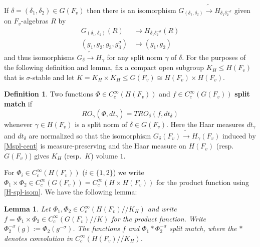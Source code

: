 \documentclass[12pt]{amsart}
\newtheorem{lem}[thm]{Lemma}
\theoremstyle{remark}
\numberwithin{equation}{section}
\newcommand{\lto}{\longrightarrow}
\theoremstyle{definition}
\newtheorem{defn}[thm]{Definition}
\numberwithin{equation}{subsection}
\begin{document}
If $\delta =(\delta_1,\delta_2) \in G(F_v)$ then there is an isomorphism $G_{(\delta_1,\delta_2)} \tilde{\to}H_{\delta_1\delta_2^{-\sigma}}$ given on $F_v$-algebras $R$ by
\begin{align} \label{Mspl-cent}
G_{(\delta_1,\delta_2)}(R) &\lto H_{\delta_1\delta_2^{-\sigma}}(R)\\
\nonumber (g_1,g_2,g_3,g_3^{\sigma}) &\longmapsto (g_1,g_2)
\end{align}
and thus isomorphisms $G_{\delta} \tilde{\lto} H_{\gamma}$ for any split norm $\gamma$ of $\delta$.
For the purposes of the following definition and lemma, fix a compact open subgroup $K_H \leq H(F_v)$ that is $\sigma$-stable and let
$K =K_H \times K_H \leq G(F_v)\cong H(F_v) \times H(F_v)$.


\begin{defn} Two functions $\Phi \in C_c^{\infty}(H(F_v))$
and $f \in C_c^{\infty}(G(F_v))$ \textbf{split match} if
$$
RO_{\gamma}(\Phi,dt_{\gamma})=TRO_{\delta}(f,dt_{\delta})
$$
whenever $\gamma \in H(F_v)$ is a split norm of $\delta \in G(F_v)$.  Here the Haar measures $dt_{\gamma}$ and $dt_{\delta}$ are normalized so that the isomorphism  $G_{\delta}(F_v) \tilde{\lto} H_{\gamma}(F_v)$ induced by \eqref{Mspl-cent} is measure-preserving and the Haar measure on $H(F_v)$ (resp.~$G(F_v)$) gives $K_H$ (resp.~$K$) volume $1$.
\end{defn}

For $\Phi_i \in C_c^{\infty}(H(F_v))$ ($i \in \{1,2\}$) we write $\Phi_1 \times \Phi_2 \in
C_c^{\infty}(G(F_v))=C_c^{\infty}(H \times H(F_v))$ for the product function using \eqref{H-spl-isom}.  We
have the following lemma:
\begin{lem} \label{lem-M-split-match} Let $\Phi_1,\Phi_2 \in C_c^{\infty}(H(F_v)//K_H)$
and write $f=\Phi_1 \times \Phi_2 \in C_c^{\infty}(G(F_v)//K)$ for
the product function.  Write $\Phi_2^{-\sigma}(g):=\Phi_2(g^{-\sigma})$.
 The functions $f$ and $\Phi_1*\Phi_2^{-\sigma}$ split match, where the $*$ denotes
 convolution in $C_c^{\infty}(H(F_v)//K_H)$.
\end{lem}
\end{document}
